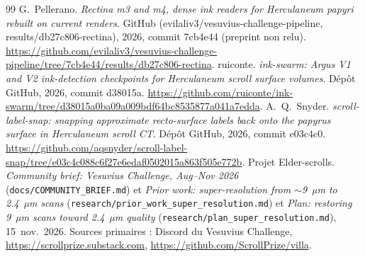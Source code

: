 \documentclass[11pt,a4paper]{article}
\begin{document}
\begin{thebibliography}{99}
 G.~Pellerano. \emph{Rectina m3 and m4, dense ink readers for Herculaneum papyri rebuilt on current renders}. GitHub (evilaliv3/vesuvius-challenge-pipeline, results/db27c806-rectina), 2026, commit 7cb4e44 (preprint non relu). \url{https://github.com/evilaliv3/vesuvius-challenge-pipeline/tree/7cb4e44/results/db27c806-rectina}.
 ruiconte. \emph{ink-swarm: Argus V1 and V2 ink-detection checkpoints for Herculaneum scroll surface volumes}. Dépôt GitHub, 2026, commit d38015a. \url{https://github.com/ruiconte/ink-swarm/tree/d38015a0ba09a009bdf64bc8535877a041a7edda}.
 A.~Q.~Snyder. \emph{scroll-label-snap: snapping approximate recto-surface labels back onto the papyrus surface in Herculaneum scroll CT}. Dépôt GitHub, 2026, commit e03c4c0. \url{https://github.com/aqsnyder/scroll-label-snap/tree/e03c4c088c6f27e6edaf0502015a863f505e772b}.
 Projet Elder-scrolls. \emph{Community brief: Vesuvius Challenge, Aug–Nov 2026} (\nolinkurl{docs/COMMUNITY_BRIEF.md}) et \emph{Prior work: super-resolution from $\sim$9~µm to 2.4~µm scans} (\nolinkurl{research/prior_work_super_resolution.md}) et \emph{Plan: restoring 9~µm scans toward 2.4~µm quality} (\nolinkurl{research/plan_super_resolution.md}), 15~nov.~2026. Sources primaires : Discord du Vesuvius Challenge, \url{https://scrollprize.substack.com}, \url{https://github.com/ScrollPrize/villa}.
\end{thebibliography}
\end{document}
